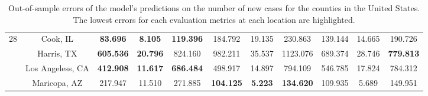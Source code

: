 \begin{landscape}
\begin{table}[!htb]
\begin{tabular}{| c | c | c | c | c | c | c | c | c | c | c |}
        \multirow{4}{*}{28}
            & Cook, IL & \textbf{83.696} & \textbf{8.105} & \textbf{119.396} & 184.792 & 19.135 & 230.863 & 139.144 & 14.665 & 190.726 \\
            & Harris, TX & \textbf{605.536} & \textbf{20.796} & 824.160 & 982.211 & 35.537 & 1123.076 & 689.374 & 28.746 & \textbf{779.813} \\
            & Los Angeless, CA & \textbf{412.908} & \textbf{11.617} & \textbf{686.484} & 498.917 & 14.897 & 794.109 & 546.785 & 17.824 & 784.312 \\
            & Maricopa, AZ & 217.947 & 11.510 & 271.885 & \textbf{104.125} & \textbf{5.223} & \textbf{134.620} & 109.935 & 5.689 & 149.951 \\ \hline
    \end{tabular}
    \caption[Out-of-sample-errors for the number of new cases for US counties]{Out-of-sample errors of the model's predictions on the number of new cases for the counties in the United States. The lowest errors for each evaluation metrics at each location are highlighted.}
    \label{tab:errors-us-counties-new-cases}
\end{table}
\end{landscape}

